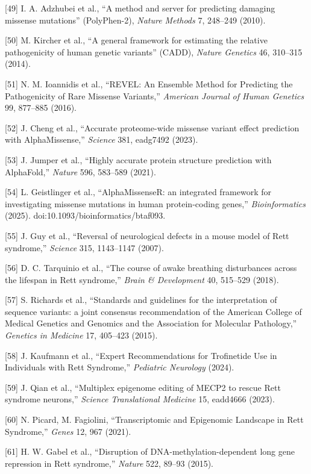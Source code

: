 \documentclass[
]{article}
\begin{document}
{[}49{]} I. A. Adzhubei et al., ``A method and server for predicting
damaging missense mutations'' (PolyPhen-2), \emph{Nature Methods} 7,
248--249 (2010).

{[}50{]} M. Kircher et al., ``A general framework for estimating the
relative pathogenicity of human genetic variants'' (CADD), \emph{Nature
Genetics} 46, 310--315 (2014).

{[}51{]} N. M. Ioannidis et al., ``REVEL: An Ensemble Method for
Predicting the Pathogenicity of Rare Missense Variants,'' \emph{American
Journal of Human Genetics} 99, 877--885 (2016).

{[}52{]} J. Cheng et al., ``Accurate proteome-wide missense variant
effect prediction with AlphaMissense,'' \emph{Science} 381, eadg7492
(2023).

{[}53{]} J. Jumper et al., ``Highly accurate protein structure
prediction with AlphaFold,'' \emph{Nature} 596, 583--589 (2021).

{[}54{]} L. Geistlinger et al., ``AlphaMissenseR: an integrated
framework for investigating missense mutations in human protein-coding
genes,'' \emph{Bioinformatics} (2025).
doi:10.1093/bioinformatics/btaf093.

{[}55{]} J. Guy et al., ``Reversal of neurological defects in a mouse
model of Rett syndrome,'' \emph{Science} 315, 1143--1147 (2007).

{[}56{]} D. C. Tarquinio et al., ``The course of awake breathing
disturbances across the lifespan in Rett syndrome,'' \emph{Brain \&
Development} 40, 515--529 (2018).

{[}57{]} S. Richards et al., ``Standards and guidelines for the
interpretation of sequence variants: a joint consensus recommendation of
the American College of Medical Genetics and Genomics and the
Association for Molecular Pathology,'' \emph{Genetics in Medicine} 17,
405--423 (2015).

{[}58{]} J. Kaufmann et al., ``Expert Recommendations for Trofinetide
Use in Individuals with Rett Syndrome,'' \emph{Pediatric Neurology}
(2024).

{[}59{]} J. Qian et al., ``Multiplex epigenome editing of MECP2 to
rescue Rett syndrome neurons,'' \emph{Science Translational Medicine}
15, eadd4666 (2023).

{[}60{]} N. Picard, M. Fagiolini, ``Transcriptomic and Epigenomic
Landscape in Rett Syndrome,'' \emph{Genes} 12, 967 (2021).

{[}61{]} H. W. Gabel et al., ``Disruption of DNA-methylation-dependent
long gene repression in Rett syndrome,'' \emph{Nature} 522, 89--93
(2015).
\end{document}
